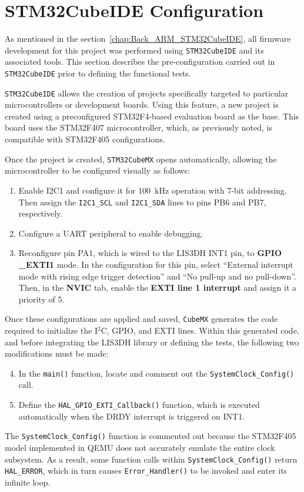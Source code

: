 \section{STM32CubeIDE Configuration}
\label{chap:test_enviroment}

As mentioned in the section~\ref{chap:Back_ARM_STM32CubeIDE}, all firmware development for 
this project was performed using \texttt{STM32CubeIDE} and its associated tools. This 
section describes the pre-configuration carried out in \texttt{STM32CubeIDE} prior to 
defining the functional tests.

\texttt{STM32CubeIDE} allows the creation of projects specifically targeted to 
particular microcontrollers or development boards. Using this feature, a new project 
is created using a preconfigured STM32F4-based evaluation board as the base. This board 
uses the STM32F407 microcontroller, which, as previously noted, is compatible with 
STM32F405 configurations.

Once the project is created, \texttt{STM32CubeMX} opens automatically, allowing the 
microcontroller to be configured visually as follows:

\begin{enumerate}
  \item Enable I2C1 and configure it for 100~kHz operation with 7-bit addressing. 
  Then assign the \texttt{I2C1\_SCL} and \texttt{I2C1\_SDA} lines to pins PB6 and PB7, respectively.
  
  \item Configure a UART peripheral to enable debugging.
  
  \item Reconfigure pin PA1, which is wired to the LIS3DH INT1 pin, to 
  \textbf{GPIO} \textbf{\_EXTI1} mode. In the configuration for this pin, select 
  ``External interrupt mode with rising edge trigger detection'' and ``No pull-up and 
  no pull-down''. Then, in the \textbf{NVIC} tab, enable the \textbf{EXTI line 1 
  interrupt} and assign it a priority of 5.
\end{enumerate}

Once these configurations are applied and saved, \texttt{CubeMX} generates the code 
required to initialize the I$^2$C, GPIO, and EXTI lines. Within this generated code, and 
before integrating the LIS3DH library or defining the tests, the following two 
modifications must be made:

\begin{enumerate}
  \setcounter{enumi}{3}
  \item In the \texttt{main()} function, locate and comment out the 
  \texttt{SystemClock\_Config()} call.
  
  \item Define the \texttt{HAL\_GPIO\_EXTI\_Callback()} function, which is executed 
  automatically when the DRDY interrupt is triggered on INT1.
\end{enumerate}

The \texttt{SystemClock\_Config()} function is commented out because the STM32F405 
model implemented in QEMU does not accurately emulate the entire clock subsystem. As 
a result, some function calls within \texttt{SystemClock\_Config()} return 
\texttt{HAL\_ERROR}, which in turn causes \texttt{Error\_Handler()} to be invoked and 
enter its infinite loop.
